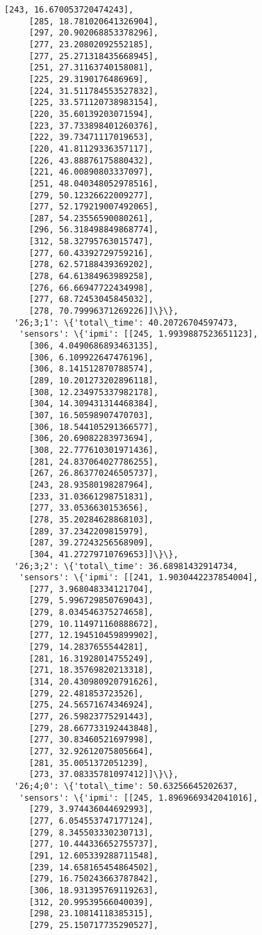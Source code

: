 \documentclass[11pt]{article}
\begin{document}
\begin{tcolorbox}[breakable, size=fbox, boxrule=.5pt, pad at break*=1mm, opacityfill=0]
\begin{Verbatim}[commandchars=\\\{\}]
     [243, 16.670053720474243],
     [285, 18.781020641326904],
     [297, 20.902068853378296],
     [277, 23.20802092552185],
     [277, 25.271318435668945],
     [251, 27.31163740158081],
     [225, 29.3190176486969],
     [224, 31.511784553527832],
     [225, 33.571120738983154],
     [220, 35.60139203071594],
     [223, 37.733898401260376],
     [222, 39.73471117019653],
     [220, 41.81129336357117],
     [226, 43.88876175880432],
     [221, 46.00890803337097],
     [251, 48.040348052978516],
     [279, 50.12326622009277],
     [277, 52.179219007492065],
     [287, 54.23556590080261],
     [296, 56.318498849868774],
     [312, 58.32795763015747],
     [277, 60.43392729759216],
     [278, 62.57188439369202],
     [278, 64.61384963989258],
     [276, 66.66947722434998],
     [277, 68.72453045845032],
     [278, 70.79996371269226]]\}\},
  '26;3;1': \{'total\_time': 40.20726704597473,
   'sensors': \{'ipmi': [[245, 1.9939887523651123],
     [306, 4.0490686893463135],
     [306, 6.109922647476196],
     [306, 8.141512870788574],
     [289, 10.201273202896118],
     [308, 12.234975337982178],
     [304, 14.309431314468384],
     [307, 16.50598907470703],
     [306, 18.544105291366577],
     [306, 20.69082283973694],
     [308, 22.777610301971436],
     [281, 24.837064027786255],
     [267, 26.863770246505737],
     [243, 28.93580198287964],
     [233, 31.03661298751831],
     [277, 33.0536630153656],
     [278, 35.20284628868103],
     [289, 37.2342209815979],
     [287, 39.27243256568909],
     [304, 41.27279710769653]]\}\},
  '26;3;2': \{'total\_time': 36.68981432914734,
   'sensors': \{'ipmi': [[241, 1.9030442237854004],
     [277, 3.968048334121704],
     [279, 5.996729850769043],
     [279, 8.034546375274658],
     [279, 10.114971160888672],
     [277, 12.194510459899902],
     [279, 14.2837655544281],
     [281, 16.31928014755249],
     [271, 18.35769820213318],
     [314, 20.430980920791626],
     [279, 22.481853723526],
     [275, 24.56571674346924],
     [277, 26.59823775291443],
     [279, 28.667733192443848],
     [277, 30.83460521697998],
     [277, 32.92612075805664],
     [281, 35.0051372051239],
     [273, 37.08335781097412]]\}\},
  '26;4;0': \{'total\_time': 50.63256645202637,
   'sensors': \{'ipmi': [[245, 1.8969669342041016],
     [279, 3.974436044692993],
     [277, 6.054553747177124],
     [279, 8.345503330230713],
     [277, 10.444336652755737],
     [291, 12.605339288711548],
     [239, 14.658165454864502],
     [279, 16.750243663787842],
     [306, 18.931395769119263],
     [312, 20.99539566040039],
     [298, 23.10814118385315],
     [279, 25.150717735290527],

\end{Verbatim}
\end{tcolorbox}
\end{document}
